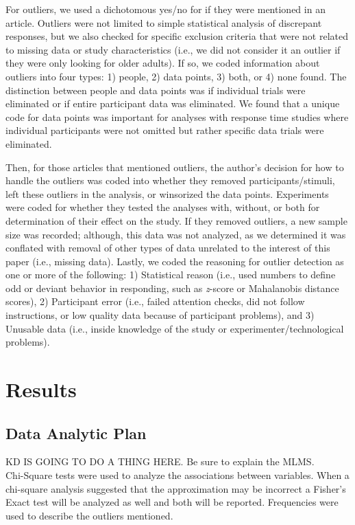 \documentclass[english,man]{apa6}
\theoremstyle{definition}
\theoremstyle{definition}
\theoremstyle{definition}
\theoremstyle{remark}
\begin{document}
For outliers, we used a dichotomous yes/no for if they were mentioned in
an article. Outliers were not limited to simple statistical analysis of
discrepant responses, but we also checked for specific exclusion
criteria that were not related to missing data or study characteristics
(i.e., we did not consider it an outlier if they were only looking for
older adults). If so, we coded information about outliers into four
types: 1) people, 2) data points, 3) both, or 4) none found. The
distinction between people and data points was if individual trials were
eliminated or if entire participant data was eliminated. We found that a
unique code for data points was important for analyses with response
time studies where individual participants were not omitted but rather
specific data trials were eliminated.

Then, for those articles that mentioned outliers, the author's decision
for how to handle the outliers was coded into whether they removed
participants/stimuli, left these outliers in the analysis, or winsorized
the data points. Experiments were coded for whether they tested the
analyses with, without, or both for determination of their effect on the
study. If they removed outliers, a new sample size was recorded;
although, this data was not analyzed, as we determined it was conflated
with removal of other types of data unrelated to the interest of this
paper (i.e., missing data). Lastly, we coded the reasoning for outlier
detection as one or more of the following: 1) Statistical reason (i.e.,
used numbers to define odd or deviant behavior in responding, such as
\emph{z}-score or Mahalanobis distance scores), 2) Participant error
(i.e., failed attention checks, did not follow instructions, or low
quality data because of participant problems), and 3) Unusable data
(i.e., inside knowledge of the study or experimenter/technological
problems).

\section{Results}\label{results}

\subsection{Data Analytic Plan}\label{data-analytic-plan}

KD IS GOING TO DO A THING HERE. Be sure to explain the MLMS.\\
Chi-Square tests were used to analyze the associations between
variables. When a chi-square analysis suggested that the approximation
may be incorrect a Fisher's Exact test will be analyzed as well and both
will be reported. Frequencies were used to describe the outliers
mentioned.
\end{document}
